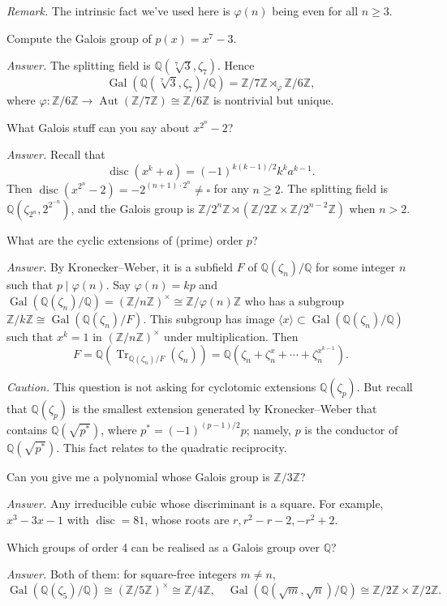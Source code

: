 \documentclass{mathproblems}
\newcommand\Q{\mathbb{Q}}
\newcommand\Z{\mathbb{Z}}
\DeclareMathOperator{\Gal}{Gal}
\begin{document}
\begin{questions}
\textit{Remark.} The intrinsic fact we've used here is $\varphi(n)$ being even for all $n\geq 3$.

\miquestion
{\color{blue} Compute the Galois group of $p(x)=x^{7}-3$.}

\textit{Answer.}
The splitting field is $\Q(\sqrt[7]{3},\zeta_7)$. Hence
$$
\Gal(\Q(\sqrt[7]{3},\zeta_7)/\Q)=\Z/7\Z \rtimes_{\varphi} \Z/6\Z,
$$
where $\varphi: \Z/6\Z \to \operatorname{Aut}(\Z/7\Z)\cong \Z/6\Z$ is nontrivial but unique.

\miquestion
{\color{blue} What Galois stuff can you say about $x^{2^{n}}-2$?}

\textit{Answer.}
Recall that
$$
\operatorname{disc}(x^k+a)=(-1)^{k(k-1)/2}k^k a^{k-1}.
$$
Then $\operatorname{disc}(x^{2^{n}}-2)=-2^{(n+1)\cdot 2^n}\neq \square$ for any $n\geq 2$. The splitting field is $\Q(\zeta_{2^n},2^{2^{-n}})$, and the Galois group is $\Z/2^{n}\Z\rtimes (\Z/2\Z\times \Z/2^{n-2}\Z)$ when $n>2$.

\miquestion
{\color{blue} What are the cyclic extensions of (prime) order $p$?}

\textit{Answer.} By Kronecker--Weber, it is a subfield $F$ of $\Q(\zeta_n)/\Q$ for some integer $n$ such that $p\mid \varphi(n)$. Say $\varphi(n)=kp$ and $\Gal(\Q(\zeta_n)/\Q)=(\Z/n\Z)^\times\cong \Z/\varphi(n)\Z$ who has a subgroup $\Z/k\Z\cong \Gal(\Q(\zeta_n)/F)$. This subgroup has image $\langle x \rangle\subset \Gal(\Q(\zeta_n)/\Q)$ such that $x^k=1$ in $(\Z/n\Z)^\times$ under multiplication. Then
$$
F=\Q(\operatorname{Tr}_{\Q(\zeta_n)/F}(\zeta_n))=\Q(\zeta_n+\zeta_n^x+\cdots +\zeta_n^{x^{k-1}}).
$$


\textit{Caution.} This question is not asking for cyclotomic extensions $\Q(\zeta_p)$. But recall that $\Q(\zeta_p)$ is the smallest extension generated by Kronecker--Weber that contains $\Q(\sqrt{p^*})$, where $p^*=(-1)^{(p-1)/2}p$; namely, $p$ is the conductor of $\Q(\sqrt{p^*})$. This fact relates to the quadratic reciprocity.

\miquestion
{\color{blue} Can you give me a polynomial whose Galois group is $\Z / 3 \Z$?}

\textit{Answer.} Any irreducible cubic whose discriminant is a square. For example, $x^3-3x-1$ with $\operatorname{disc}=81$, whose roots are $r, r^2-r-2, -r^2+2$.

\miquestion
{\color{blue} Which groups of order 4 can be realised as a Galois group over $\Q$?}

\textit{Answer.} Both of them: for square-free integers $m\neq n$,
$$
\Gal(\Q(\zeta_5)/\Q)\cong (\Z/5\Z)^\times \cong \Z/4\Z,\quad \Gal(\Q(\sqrt{m},\sqrt{n})/\Q)\cong \Z/2\Z\times \Z/2\Z.
$$


\end{questions}
\end{document}
